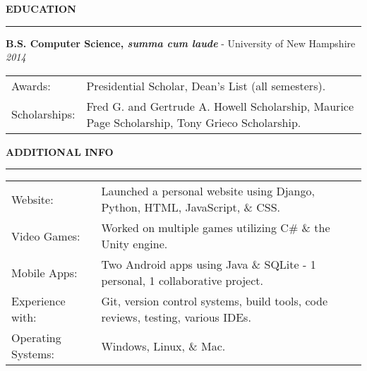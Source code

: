 \documentclass[letterpaper,10pt]{article}
\begin{document}
\noindent
\textbf{EDUCATION}
\vspace{5pt}
\hrule
\vspace{3pt}
\noindent\textbf{B.S. Computer Science, \textit{summa cum laude}} - University of New Hampshire
\hfill
\textit{2014}\\
\noindent\begin{tabular}{@{}l l}
  Awards: & Presidential Scholar, Dean’s List (all semesters).\\
  Scholarships: & Fred G. and Gertrude A. Howell Scholarship, Maurice Page Scholarship, Tony Grieco Scholarship.\\
\end{tabular}

\vspace{\baselineskip}
\noindent
\textbf{ADDITIONAL INFO}
\vspace{5pt}
\hrule
\vspace{3pt}
\noindent\begin{tabular}{@{}l l}
  Website: & Launched a personal website using Django, Python, HTML, JavaScript, \& CSS.\\
  Video Games: & Worked on multiple games utilizing C\# \& the Unity engine.\\
  Mobile Apps: & Two Android apps using Java \& SQLite - 1 personal, 1 collaborative project.\\
  Experience with: & Git, version control systems, build tools, code reviews, testing, various IDEs.\\
  Operating Systems: & Windows, Linux, \& Mac.
\end{tabular}
\end{document}
